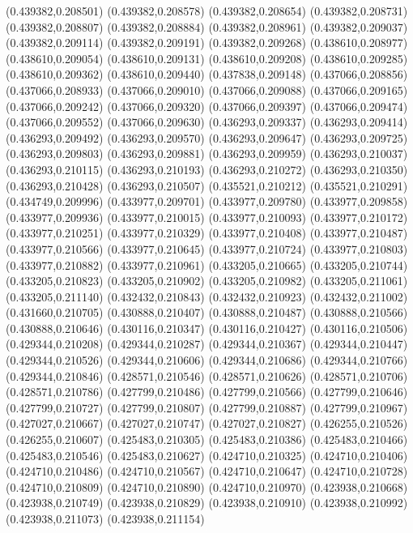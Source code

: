 (0.439382,0.208501)
(0.439382,0.208578)
(0.439382,0.208654)
(0.439382,0.208731)
(0.439382,0.208807)
(0.439382,0.208884)
(0.439382,0.208961)
(0.439382,0.209037)
(0.439382,0.209114)
(0.439382,0.209191)
(0.439382,0.209268)
(0.438610,0.208977)
(0.438610,0.209054)
(0.438610,0.209131)
(0.438610,0.209208)
(0.438610,0.209285)
(0.438610,0.209362)
(0.438610,0.209440)
(0.437838,0.209148)
(0.437066,0.208856)
(0.437066,0.208933)
(0.437066,0.209010)
(0.437066,0.209088)
(0.437066,0.209165)
(0.437066,0.209242)
(0.437066,0.209320)
(0.437066,0.209397)
(0.437066,0.209474)
(0.437066,0.209552)
(0.437066,0.209630)
(0.436293,0.209337)
(0.436293,0.209414)
(0.436293,0.209492)
(0.436293,0.209570)
(0.436293,0.209647)
(0.436293,0.209725)
(0.436293,0.209803)
(0.436293,0.209881)
(0.436293,0.209959)
(0.436293,0.210037)
(0.436293,0.210115)
(0.436293,0.210193)
(0.436293,0.210272)
(0.436293,0.210350)
(0.436293,0.210428)
(0.436293,0.210507)
(0.435521,0.210212)
(0.435521,0.210291)
(0.434749,0.209996)
(0.433977,0.209701)
(0.433977,0.209780)
(0.433977,0.209858)
(0.433977,0.209936)
(0.433977,0.210015)
(0.433977,0.210093)
(0.433977,0.210172)
(0.433977,0.210251)
(0.433977,0.210329)
(0.433977,0.210408)
(0.433977,0.210487)
(0.433977,0.210566)
(0.433977,0.210645)
(0.433977,0.210724)
(0.433977,0.210803)
(0.433977,0.210882)
(0.433977,0.210961)
(0.433205,0.210665)
(0.433205,0.210744)
(0.433205,0.210823)
(0.433205,0.210902)
(0.433205,0.210982)
(0.433205,0.211061)
(0.433205,0.211140)
(0.432432,0.210843)
(0.432432,0.210923)
(0.432432,0.211002)
(0.431660,0.210705)
(0.430888,0.210407)
(0.430888,0.210487)
(0.430888,0.210566)
(0.430888,0.210646)
(0.430116,0.210347)
(0.430116,0.210427)
(0.430116,0.210506)
(0.429344,0.210208)
(0.429344,0.210287)
(0.429344,0.210367)
(0.429344,0.210447)
(0.429344,0.210526)
(0.429344,0.210606)
(0.429344,0.210686)
(0.429344,0.210766)
(0.429344,0.210846)
(0.428571,0.210546)
(0.428571,0.210626)
(0.428571,0.210706)
(0.428571,0.210786)
(0.427799,0.210486)
(0.427799,0.210566)
(0.427799,0.210646)
(0.427799,0.210727)
(0.427799,0.210807)
(0.427799,0.210887)
(0.427799,0.210967)
(0.427027,0.210667)
(0.427027,0.210747)
(0.427027,0.210827)
(0.426255,0.210526)
(0.426255,0.210607)
(0.425483,0.210305)
(0.425483,0.210386)
(0.425483,0.210466)
(0.425483,0.210546)
(0.425483,0.210627)
(0.424710,0.210325)
(0.424710,0.210406)
(0.424710,0.210486)
(0.424710,0.210567)
(0.424710,0.210647)
(0.424710,0.210728)
(0.424710,0.210809)
(0.424710,0.210890)
(0.424710,0.210970)
(0.423938,0.210668)
(0.423938,0.210749)
(0.423938,0.210829)
(0.423938,0.210910)
(0.423938,0.210992)
(0.423938,0.211073)
(0.423938,0.211154)
